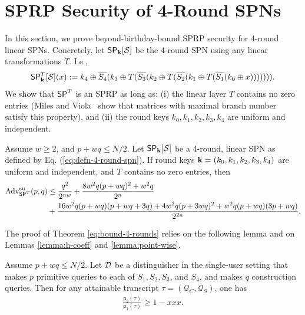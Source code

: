 
\section{SPRP Security of 4-Round SPNs}
\label{section:security of 4-round SPNs}

In this section, we prove beyond-birthday-bound SPRP security for 4-round linear SPNs. Concretely, let $\mathsf{SP}_{\mathbf{k}}[\mathcal{S}]$ be the 4-round SPN using any linear transformations $T$. I.e.,
%
\begin{align}
\mathsf{SP}_{\mathbf{k}}^T[\mathcal{S}](x):=k_4\oplus\overline{S_4}(k_3\oplus T(\overline{S_3}(k_2\oplus T(\overline{S_2}(k_1\oplus T(\overline{S_1}(k_0\oplus x))))))).
\label{eq:defn-4-round-spn}
\end{align}
%
We show that $\mathsf{SP}^T$ is an SPRP as long as: (i) the linear layer $T$ contains no zero entries (Miles and Viola~\cite{miles2015substitution} show that matrices with maximal branch number~\cite{daemen1995cipher} satisfy this property), and (ii) the round keys $k_0,k_1,k_2,k_3,k_4$ are uniform and independent.


\begin{theorem}
\label{theorem:4-round-spn}

Assume $w\geq2$, and $p+wq\leq N/2$. Let $\mathsf{SP}_{\mathbf{k}}[\mathcal{S}]$ be a 4-round, linear SPN as defined by Eq. (\ref{eq:defn-4-round-spn}). If round keys $\mathbf{k}=(k_0,k_1,k_2,k_3,k_4)$ are uniform and independent, and $T$ contains no zero entries, then
%
\begin{align}
\operatorname{Adv}_{\mathsf{SP}^T}^{\mathrm{su}}(p, q) &\leq \frac{q^2}{2^{n w}} + \frac{8 w^2 q(p+wq)^2+w^2 q}{2^n}\\
&+ \frac{16 w^2 q(p+w q)(p+w q +3 q)+4 w^2 q(p+3 wq)^2+ w^2q(p+w q)(3p+w q)}{2^{2 n}}.
\label{eq:bound-4-rounds}
\end{align}
\end{theorem}
The proof of Theorem \ref{eq:bound-4-rounds} relies on the following lemma and on Lemmas \ref{lemma:h-coeff} and \ref{lemma:point-wise}.


\begin{lemma}
	\label{lemma:proximity-4-round}
	
	Assume $p+wq\leq N/2$. Let $\mathcal{D}$ be a distinguisher in the single-user setting that makes $p$ primitive queries to each of $S_1,S_2,S_3$, and $S_4$, and makes $q$ construction queries. Then for any attainable
	transcript $\tau=(\mathcal{Q}_C,\mathcal{Q}_S)$, one has
	\begin{align}
	\frac{\mathsf{p}_{2}(\tau)}{\mathsf{p}_{1}(\tau)}
	\geq 1 - xxx.
	\label{eq:bound-proximity-4-round}
	\end{align}
\end{lemma}




